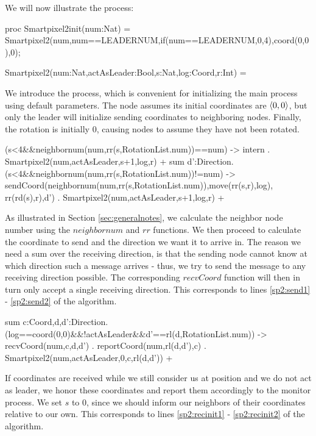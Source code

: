 We will now illustrate the  process:

\begin{codeverb}
proc    Smartpixel2init(num:Nat) =
         Smartpixel2(num,num==LEADERNUM,if(num==LEADERNUM,0,4),coord(0,0),0);

        Smartpixel2(num:Nat,actAsLeader:Bool,s:Nat,log:Coord,r:Int) =
\end{codeverb}

We introduce the  process, which is convenient for initializing the main  process using default parameters. The node assumes its initial coordinates are $\langle 0,0 \rangle$, but only the leader will initialize sending coordinates to neighboring nodes. Finally, the rotation is initially $0$, causing nodes to assume they have not been rotated.

\begin{codeverb}
(s<4&&neighbornum(num,rr(s,RotationList.num))==num) -> intern .
          Smartpixel2(num,actAsLeader,s+1,log,r) +
sum d':Direction.(s<4&&neighbornum(num,rr(s,RotationList.num))!=num) ->
         sendCoord(neighbornum(num,rr(s,RotationList.num)),move(rr(s,r),log),
          rr(rd(s),r),d') .
         Smartpixel2(num,actAsLeader,s+1,log,r) +
\end{codeverb}

As illustrated in Section \ref{sec:generalnotes}, we calculate the neighbor node number using the $neighbornum$ and $rr$ functions. We then proceed to calculate the coordinate to send and the direction we want it to arrive in. The reason we need a sum over the receiving direction, is that the sending node cannot know at which direction such a message arrives - thus, we try to send the message to any receiving direction possible. The corresponding $recvCoord$ function will then in turn only accept a single receiving direction. This corresponds to lines \ref{sp2:send1} - \ref{sp2:send2} of the algorithm.

\begin{codeverb}
sum c:Coord,d,d':Direction.(log==coord(0,0)&&!actAsLeader&&d'==rl(d,RotationList.num)) ->
       recvCoord(num,c,d,d') . reportCoord(num,rl(d,d'),c) .
       Smartpixel2(num,actAsLeader,0,c,rl(d,d')) +
\end{codeverb}

If coordinates are received while we still consider us at position  and we do not act as leader, we honor these coordinates and report them accordingly to the monitor process. We set $s$ to $0$, since we should inform our neighbors of their coordinates relative to our own. This corresponds to lines \ref{sp2:recinit1} - \ref{sp2:recinit2} of the algorithm.

